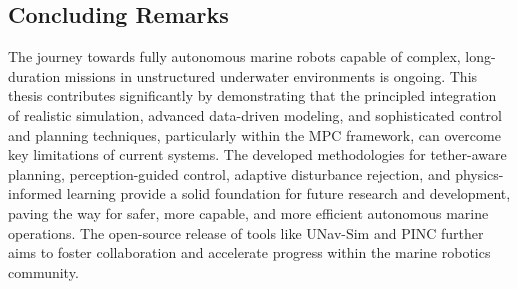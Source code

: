 \subsection{Concluding Remarks}
The journey towards fully autonomous marine robots capable of complex, long-duration missions in unstructured underwater environments is ongoing. This thesis contributes significantly by demonstrating that the principled integration of realistic simulation, advanced data-driven modeling, and sophisticated control and planning techniques, particularly within the \ac{MPC} framework, can overcome key limitations of current systems. The developed methodologies for tether-aware planning, perception-guided control, adaptive disturbance rejection, and physics-informed learning provide a solid foundation for future research and development, paving the way for safer, more capable, and more efficient autonomous marine operations. The open-source release of tools like UNav-Sim and PINC further aims to foster collaboration and accelerate progress within the marine robotics community.

